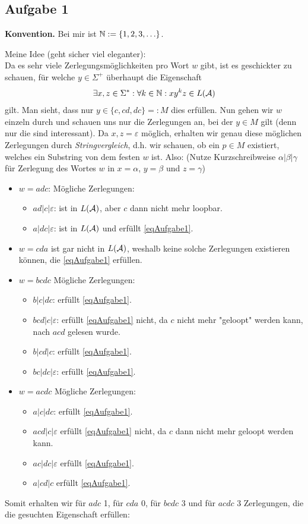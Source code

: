 \subsection{Aufgabe 1}
\textbf{Konvention.} Bei mir ist $\mathbb{N}:=\lbrace 1,2,3,\ldots\rbrace$.\nl

Meine Idee (geht sicher viel eleganter):\\
Da es sehr viele Zerlegungsmöglichkeiten pro Wort $w$ gibt, ist es geschickter zu schauen, für welche $y\in\Sigma^+$ überhaupt die Eigenschaft 
\begin{align*}
	\exists x,z\in\Sigma^\ast:\forall k\in\mathbb{N}:xy^kz\in L(\mathcal{A})
\end{align*}
gilt.
Man sieht, dass nur $y\in\lbrace c,cd,dc\rbrace=:M$ dies erfüllen. Nun gehen wir $w$ einzeln durch und schauen uns nur die Zerlegungen an, bei der $y\in M$ gilt (denn nur die sind interessant). Da $x,z=\varepsilon$ möglich, erhalten wir genau diese möglichen Zerlegungen durch \textit{Stringvergleich}, d.h. wir schauen, ob ein $p\in M$ existiert, welches ein Substring von dem festen $w$ ist. Also: (Nutze Kurzschreibweise $\alpha|\beta|\gamma$ für Zerlegung des Wortes $w$ in $x=\alpha$, $y=\beta$ und $z=\gamma$)
\begin{itemize}
	\item $w=adc$: Mögliche Zerlegungen: 
	\begin{itemize}
		\item $ad|c|\varepsilon$: ist in $L(\mathcal{A})$, aber $c$ dann nicht mehr loopbar.
		\item $a|dc|\varepsilon$: ist in $L(\mathcal{A})$ und erfüllt \eqref{eqAufgabe1}.
	\end{itemize}
	\item $w=cda$ ist gar nicht in $L(\mathcal{A})$, weshalb keine solche Zerlegungen existieren können, die \eqref{eqAufgabe1} erfüllen. 
	\item $w=bcdc$ Mögliche Zerlegungen: 
	\begin{itemize}
		\item $b|c|dc$: erfüllt \eqref{eqAufgabe1}.
		\item $bcd|c|\varepsilon$: erfüllt \eqref{eqAufgabe1} nicht, da $c$ nicht mehr "geloopt" werden kann, nach $acd$ gelesen wurde.
		\item $b|cd|c$: erfüllt \eqref{eqAufgabe1}.
		\item $bc|dc|\varepsilon$: erfüllt \eqref{eqAufgabe1}.
	\end{itemize}
	\item $w=acdc$ Mögliche Zerlegungen: 
	\begin{itemize}
		\item $a|c|dc$: erfüllt \eqref{eqAufgabe1}.
		\item $acd|c|\varepsilon$ erfüllt \eqref{eqAufgabe1} nicht, da $c$ dann nicht mehr geloopt werden kann.
		\item $ac|dc|\varepsilon$ erfüllt \eqref{eqAufgabe1}.
		\item $a|cd|c$ erfüllt \eqref{eqAufgabe1}.
	\end{itemize}
\end{itemize}
Somit erhalten wir für $adc$ 1, für $cda$ 0, für $bcdc$ 3 und für $acdc$ 3 Zerlegungen, die die gesuchten Eigenschaft erfüllen:

